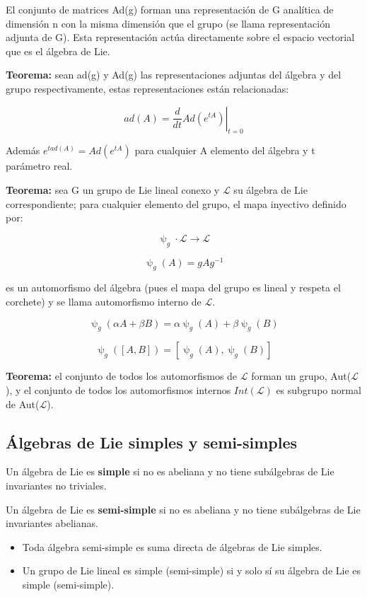 El conjunto de matrices Ad(g) forman una representación de G analítica de dimensión n con la misma dimensión que el grupo (se llama representación adjunta de G). Esta representación actúa directamente sobre el espacio vectorial que es el álgebra de Lie.

\smallskip
\textbf{Teorema:} sean ad(g) y Ad(g) las representaciones adjuntas del álgebra y del grupo respectivamente, estas representaciones están relacionadas:

$$ad(A)= \left . \frac{d}{dt}Ad(e^{tA})\right |_{t=0}$$

Además $e^{t ad(A)}=Ad(e^{tA})$ para cualquier A elemento del álgebra y t parámetro real.

\smallskip
\textbf{Teorema:} sea G un grupo de Lie lineal conexo y $\mathcal{L}$ su álgebra de Lie correspondiente; para cualquier elemento del grupo, el mapa inyectivo definido por:

$$\uppsi _g \cdot \mathcal{L} \to \mathcal{L}$$

$$\uppsi _g (A)=gAg^{-1}$$

es un automorfismo del álgebra (pues el mapa del grupo es lineal y respeta el corchete) y se llama automorfismo interno de $\mathcal{L}$.

$$\uppsi _g (\alpha A + \beta B)=\alpha \uppsi _g (A) + \beta \uppsi _g (B)$$

$$\uppsi _g ([A,B])=[\uppsi _g (A), \uppsi _g (B)]$$

\smallskip
\textbf{Teorema:} el conjunto de todos los automorfismos de $\mathcal{L}$ forman un grupo, Aut($\mathcal{L}$), y el conjunto de todos los automorfismos internos $Int(\mathcal{L})$ es subgrupo normal de Aut($\mathcal{L}$).

\subsection{Álgebras de Lie simples y semi-simples}

Un álgebra de Lie es \textbf{simple} si no es abeliana y no tiene subálgebras de Lie invariantes no triviales.

Un álgebra de Lie es \textbf{semi-simple} si no es abeliana y no tiene subálgebras de Lie invariantes abelianas.

\begin{itemize}
\item Toda álgebra semi-simple es suma directa de álgebras de Lie simples.
\item Un grupo de Lie lineal es simple (semi-simple) si y solo sí su álgebra de Lie es simple (semi-simple).
\end{itemize}

